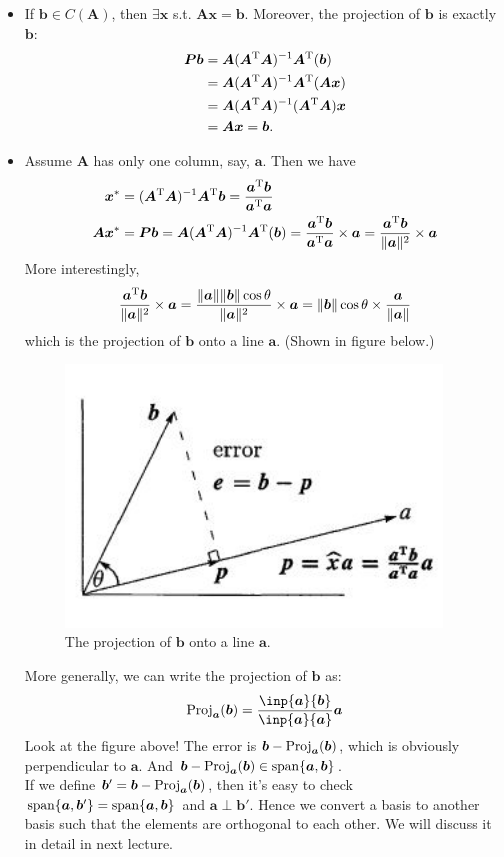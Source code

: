 \begin{itemize}
\item
If $\bm b\in C(\bm A)$, then $\exists \bm x$ s.t. $\bm{Ax}=\bm b$. Moreover, the projection of $\bm b$ is exactly $\bm b$:
\[
\begin{aligned}
\bm{Pb}&=\bm A(\bm A^{\mathrm T}\bm A)^{-1}\bm A^{\mathrm T}(\bm b)\\
&=\bm A(\bm A^{\mathrm T}\bm A)^{-1}\bm A^{\mathrm T}(\bm{Ax})\\
&=\bm A(\bm A^{\mathrm T}\bm A)^{-1}(\bm A^{\mathrm T}\bm A)\bm x\\
&=\bm{Ax}=\bm b.
\end{aligned}
\]
\item
Assume $\bm A$ has only one column, say, $\bm a$. Then we have
\[\begin{aligned}
\bm x^{*}&=(\bm A^{\mathrm T}\bm A)^{-1}\bm A^{\mathrm T}\bm b=\frac{\bm a^{\mathrm T}\bm b}{\bm a^{\mathrm T}\bm a}\\
\bm A\bm x^{*}&=\bm{Pb}=\bm A(\bm A^{\mathrm T}\bm A)^{-1}\bm A^{\mathrm T}(\bm b)=\frac{\bm a^{\mathrm T}\bm b}{\bm a^{\mathrm T}\bm a}\times\bm a=\frac{\bm a^{\mathrm T}\bm b}{\|\bm a\|^2}\times\bm a
\end{aligned}
\]
More interestingly, 
\[\frac{\bm a^{\mathrm T}\bm b}{\|\bm a\|^2}\times\bm a=\frac{\|\bm a\|\|\bm b\|\cos\theta}{\|\bm a\|^2}\times\bm a=\|\bm b\|\cos\theta\times\frac{\bm a}{\|\bm a\|}\]
which is the projection of $\bm b$ onto a line $\bm a$. (Shown in figure below.)
\begin{figure}[H]
\centering\includegraphics[width=10cm]{week5/projection_line}
\caption{The projection of $\bm b$ onto a line $\bm a$.}
\end{figure}
More generally, we can write the projection of $\bm b$ as:
\[
\Proj_{\bm a}(\bm b)=\frac{\inp{\bm a}{\bm b}}{\inp{\bm a}{\bm a}}\bm a
\]
Look at the figure above! The error is $\bm b-\operatorname{Proj}_{\bm a}(\bm b)$, which is obviously perpendicular to $\bm a$. And $\bm b-\operatorname{Proj}_{\bm a}(\bm b)\in\operatorname{span}\{\bm a,\bm b\}$.\\
If we define $\bm b'=\bm b-\operatorname{Proj}_{\bm a}(\bm b)$, then it's easy to check $\operatorname{span}\{\bm a,\bm b'\}=\operatorname{span}\{\bm a,\bm b\}$ and $\bm a\perp\bm b'$. Hence we convert a basis to another basis such that the elements are orthogonal to each other. We will discuss it in detail in next lecture. 
\end{itemize}








